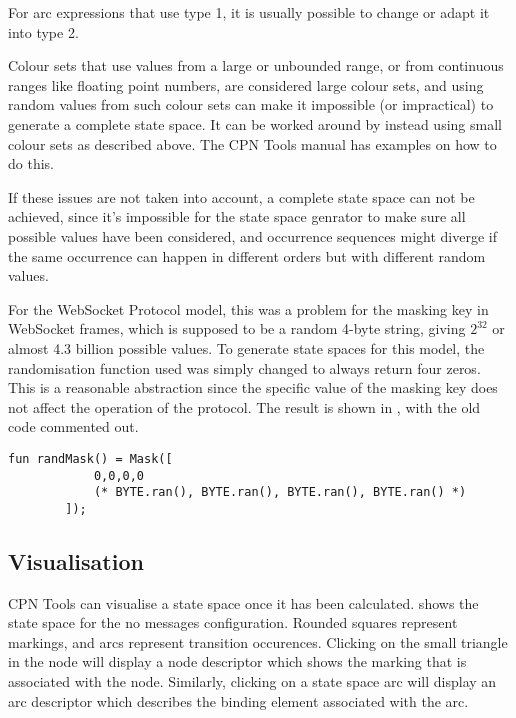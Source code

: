 		For arc expressions that use type 1, it is usually possible to change or
		adapt it into type 2.
		
		Colour sets that use values from a large or unbounded range, or from continuous
		ranges like floating point numbers, are considered large colour sets, and using
		random values from such colour sets can make it impossible (or impractical)
		to generate a complete state space. It can be worked around by
		instead using small colour sets as described above. The CPN Tools manual has
		examples on how to do this.
		
		If these issues are not taken into account, a complete state space can not be
		achieved, since it's impossible for the state space genrator to make sure all
		possible values have been considered, and occurrence sequences might diverge
		if the same occurrence can happen in different orders but with different
		random values.
		
		For the WebSocket Protocol model, this was a problem for the masking
		key in WebSocket frames, which is supposed to be a random 4-byte string,
		giving $2^{32}$ or almost 4.3 billion possible values.
		To generate state spaces for this model, the randomisation function used was
		simply changed to always return four zeros. This is a reasonable abstraction
		since the specific value of the masking key does not affect the operation of
		the protocol. The result is shown in , with the old
		code commented out.
		
		\begin{lstlisting}[label=lst:fixed_masking_key,gobble=2,caption=Fixed masking
		key] 
		fun	randMask() = Mask([ 
			0,0,0,0
			(* BYTE.ran(), BYTE.ran(), BYTE.ran(), BYTE.ran() *)
		]);
		\end{lstlisting}
	
	\subsection{Visualisation}
	CPN Tools can visualise a state space once it has been calculated.
	 shows the state space for the no messages
	configuration. Rounded squares represent markings, and arcs represent
	transition occurences. Clicking on the small triangle in the node will display
	a node descriptor which shows the marking that is associated with the node.
	Similarly, clicking on a state space arc will display an arc descriptor which
	describes the binding element associated with the arc. 

